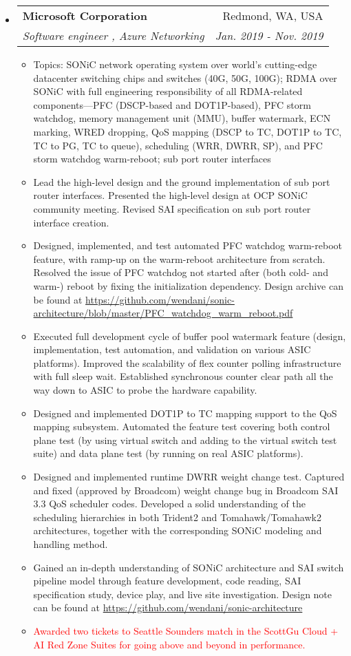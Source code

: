 \documentclass[letterpaper,11pt]{article}
\makeatletter
\newcommand{\ressubheading}[4]{
\begin{tabular*}{6.69in}{l@{\extracolsep{\fill}}r}
        \textbf{#1} & #2 \\
        \textit{#3} & \textit{#4} \\
\end{tabular*}\vspace{-6pt}
}
\newcommand{\resitem}[1]{\item #1 \vspace{-2pt}}
\makeatother
\begin{document}
\begin{CJK}{UTF8}{gbsn}
\begin{itemize}
\item
  \ressubheading{Microsoft Corporation}{Redmond, WA, USA}
  {Software engineer \Romannum{2}, Azure Networking}{Jan. 2019 - Nov. 2019}
  \begin{itemize}
  \resitem{Topics: SONiC network operating system over world's cutting-edge datacenter switching chips and switches (40G, 50G, 100G);
  RDMA over SONiC with full engineering responsibility of all RDMA-related components---PFC (DSCP-based and DOT1P-based), PFC storm watchdog,
  memory management unit (MMU), buffer watermark, ECN marking,
  WRED dropping, QoS mapping (DSCP to TC, DOT1P to TC, TC to PG, TC to queue), scheduling (WRR, DWRR, SP), and PFC storm watchdog warm-reboot;
  sub port router interfaces}
  \resitem{Lead the high-level design and the ground implementation of sub port router interfaces.
  Presented the high-level design at OCP SONiC community meeting. Revised SAI specification on sub port router interface creation.}
  \resitem{Designed, implemented, and test automated PFC watchdog warm-reboot feature, with ramp-up on the
  warm-reboot architecture from scratch.
  Resolved the issue of PFC watchdog not started after (both cold- and warm-) reboot by fixing the initialization dependency.
  Design archive can be found at \url{https://github.com/wendani/sonic-architecture/blob/master/PFC\_watchdog\_warm\_reboot.pdf}}
  \resitem{Executed full development cycle of buffer pool watermark feature (design, implementation, test automation,
  and validation on various ASIC platforms).
  Improved the scalability of flex counter polling infrastructure with full sleep wait.
  Established synchronous counter clear path all the way down to ASIC to probe the hardware capability.}
  \resitem{Designed and implemented DOT1P to TC mapping support to the QoS mapping subsystem.
  Automated the feature test covering both control plane test (by using virtual switch and adding to the virtual switch test suite) and data plane
  test (by running on real ASIC platforms).}
  \resitem{Designed and implemented runtime DWRR weight change test.
  Captured and fixed (approved by Broadcom) weight change bug in Broadcom SAI 3.3 QoS scheduler codes.
  Developed a solid understanding of the scheduling hierarchies in both Trident2 and Tomahawk/Tomahawk2 architectures,
  together with the corresponding SONiC modeling and handling method.}
  \resitem{Gained an in-depth understanding of SONiC architecture and SAI switch pipeline model
  through feature development, code reading, SAI specification study, device play, and live site investigation.
  Design note can be found at \url{https://github.com/wendani/sonic-architecture}}
  \resitem{\textcolor{Red}{Awarded two tickets to Seattle Sounders match in the ScottGu Cloud + AI Red Zone Suites for going above and beyond in performance.}}
  \end{itemize}


\end{itemize}
\end{CJK}
\end{document}
